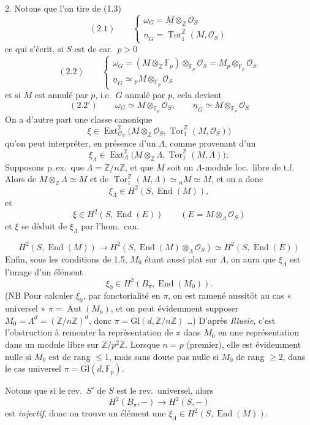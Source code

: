\documentclass[11pt,a4paper]{article}
\begin{document}
2. Notons que  l'on tire de
(1.3)
\[
(2.1) \qquad
\begin{cases}
\omega_G = \underline{M} \otimes_{\mathbb{Z}} \mathcal{O}_S \\
\underline{n}_G = \underline{\operatorname{Tor}}^{\mathbb{Z}}_1(M, \mathcal{O}_S)
\end{cases}
\]
ce qui s'écrit, si $S$ est de car.\ $p > 0$
\[
(2.2) \qquad
\begin{cases}
\omega_G = (M \otimes_{\mathbb{Z}} \mathbb{F}_p) \otimes_{\mathbb{F}_p} \mathcal{O}_S = M_p \otimes_{\mathbb{F}_p} \mathcal{O}_S \\
\underline{n}_G \simeq {}_pM \otimes_{\mathbb{F}_p} \mathcal{O}_S
\end{cases}
\]
et si $M$ est annulé par $p$, i.e.\ $G$ annulé par $p$, cela devient
\[
(2.2') \qquad \omega_G \simeq M \otimes_{\mathbb{F}_p} \mathcal{O}_S, \qquad \underline{n}_G \simeq M \otimes_{\mathbb{F}_p} \mathcal{O}_S
\]
On a d'autre part une classe canonique
\[
\xi \in \operatorname{Ext}^2_{\mathcal{O}_S}\bigl(M \otimes_{\mathbb{Z}} \mathcal{O}_S, \operatorname{Tor}^{\mathbb{Z}}_1(M, \mathcal{O}_S)\bigr)
\]
qu'on peut interpréter, en présence d'un $\Lambda$, comme provenant d'un
\[
\xi_\Lambda \in \operatorname{Ext}^2_\Lambda\bigl(M \otimes_{\mathbb{Z}} \Lambda, \operatorname{Tor}^{\mathbb{Z}}_1(M, \Lambda)\bigr) ;
\]
Supposons p.\,ex.\ que $\Lambda = \mathbb{Z}/n\mathbb{Z}$, et que $M$
 soit un $\Lambda$-module loc.\ libre de t.f.
Alors \ill{} \ill{} \ill{} de $M \otimes_{\mathbb{Z}} \Lambda \simeq M$ et de
$\operatorname{Tor}^{\mathbb{Z}}_1(M, \Lambda) \simeq {}_nM \simeq M$, et on a
donc
\[
\xi_\Lambda \in H^2(S, \operatorname{End}(M)) ,
\]
et 
\[
\xi \in H^2(S, \operatorname{End}(E)) \qquad (E = M \otimes_\Lambda \mathcal{O}_S)
\]
et $\xi$ se déduit de $\xi_\Lambda$ par l'hom.\ can.


\[
H^2(S, \operatorname{End}(M)) \to H^2(S, \operatorname{End}(M) \otimes_\Lambda \mathcal{O}_S) \simeq H^2(S, \operatorname{End}(E))
\]
Enfin, sous les conditions de 1.5, $M_0$ étant aussi plat sur $\Lambda$, on
aura que $\xi_\Lambda$ est l'image d'un élément
\[
\xi_0 \in H^2(B_\pi, \operatorname{End}(M_0)) .
\]
(NB Pour calculer $\xi_0$, par fonctorialité en $\pi$, on est ramené
aussitôt au cas « universel » $\pi = \operatorname{Aut}(M_0)$, et on peut
évidemment supposer $M_0 = \Lambda^d = (\mathbb{Z}/n\mathbb{Z})^d$, donc
$\pi = \mathrm{Gl}(d, \mathbb{Z}/n\mathbb{Z})$ \ldots) D'après
\emph{Illusie}, c'est l'obstruction à remonter la représentation de $\pi$
dans $M_0$ en une représentation dans un module libre sur
$\mathbb{Z}/p^2\mathbb{Z}$. Lorsque $n = p$ (premier), elle est évidemment
nulle si $M_0$ est de rang $\le 1$, mais sans doute pas nulle si $M_0$ de
rang $\ge 2$, dans le cas universel $\pi = \mathrm{Gl}(d, \mathbb{F}_p)$.

Notons que si le rev.\ $S'$ de $S$ est le rev.\ universel, alors
\[
H^2(B_\pi, -) \longrightarrow H^2(S, -)
\]
est \emph{injectif}, donc on trouve un élément \ill{} une
 $\xi_\Lambda \in H^2(S, \operatorname{End}(M))$.
\end{document}
